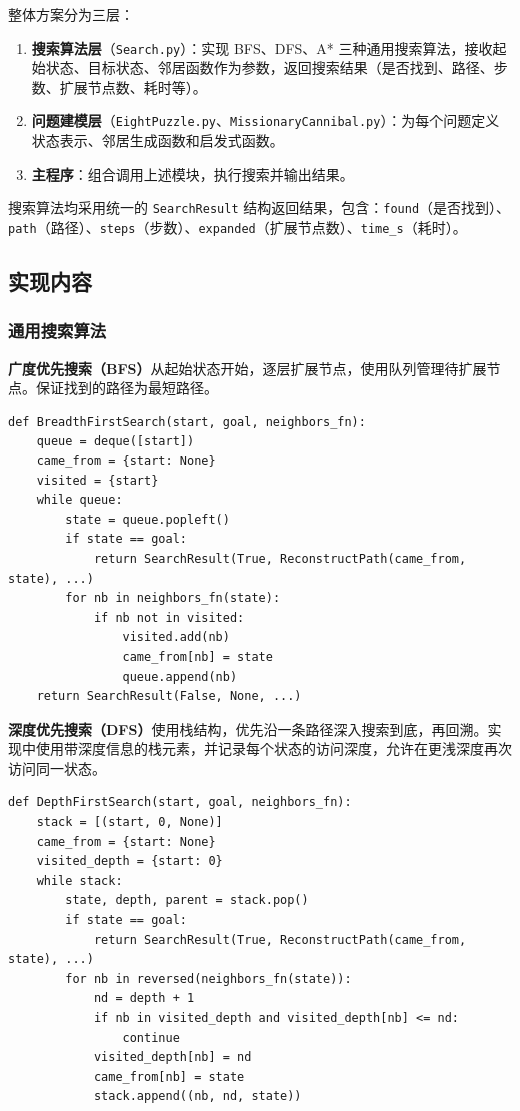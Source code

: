 \documentclass[UTF8]{ctexart}
\begin{document}
整体方案分为三层：

\begin{enumerate}
  \item \textbf{搜索算法层}（\texttt{Search.py}）：实现 BFS、DFS、A* 三种通用搜索算法，接收起始状态、目标状态、邻居函数作为参数，返回搜索结果（是否找到、路径、步数、扩展节点数、耗时等）。
  \item \textbf{问题建模层}（\texttt{EightPuzzle.py}、\texttt{MissionaryCannibal.py}）：为每个问题定义状态表示、邻居生成函数和启发式函数。
  \item \textbf{主程序}：组合调用上述模块，执行搜索并输出结果。
\end{enumerate}

搜索算法均采用统一的 \texttt{SearchResult} 结构返回结果，包含：\texttt{found}（是否找到）、\texttt{path}（路径）、\texttt{steps}（步数）、\texttt{expanded}（扩展节点数）、\texttt{time\_s}（耗时）。

\subsection{实现内容}

\subsubsection{通用搜索算法}

\textbf{广度优先搜索（BFS）}从起始状态开始，逐层扩展节点，使用队列管理待扩展节点。保证找到的路径为最短路径。

\begin{lstlisting}[caption={BFS 算法核心逻辑}]
def BreadthFirstSearch(start, goal, neighbors_fn):
    queue = deque([start])
    came_from = {start: None}
    visited = {start}
    while queue:
        state = queue.popleft()
        if state == goal:
            return SearchResult(True, ReconstructPath(came_from, state), ...)
        for nb in neighbors_fn(state):
            if nb not in visited:
                visited.add(nb)
                came_from[nb] = state
                queue.append(nb)
    return SearchResult(False, None, ...)
\end{lstlisting}

\textbf{深度优先搜索（DFS）}使用栈结构，优先沿一条路径深入搜索到底，再回溯。实现中使用带深度信息的栈元素，并记录每个状态的访问深度，允许在更浅深度再次访问同一状态。

\begin{lstlisting}[caption={DFS 算法核心逻辑}]
def DepthFirstSearch(start, goal, neighbors_fn):
    stack = [(start, 0, None)]
    came_from = {start: None}
    visited_depth = {start: 0}
    while stack:
        state, depth, parent = stack.pop()
        if state == goal:
            return SearchResult(True, ReconstructPath(came_from, state), ...)
        for nb in reversed(neighbors_fn(state)):
            nd = depth + 1
            if nb in visited_depth and visited_depth[nb] <= nd:
                continue
            visited_depth[nb] = nd
            came_from[nb] = state
            stack.append((nb, nd, state))
\end{lstlisting}
\end{document}
